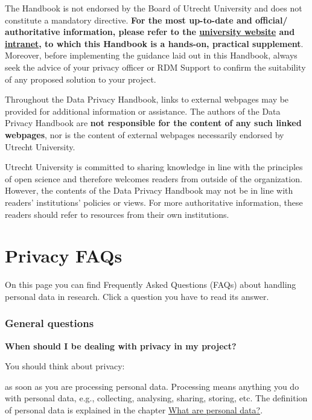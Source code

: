 \documentclass[
]{book}
\begin{document}
The Handbook is not endorsed by the Board of Utrecht University and does not
constitute a mandatory directive. \textbf{For the most up-to-date and official/
authoritative information, please refer to the
\href{https://www.uu.nl/en/research/research-data-management}{university website}
and \href{https://intranet.uu.nl/en/knowledge-base/privacy-at-uu}{intranet},
to which this Handbook is a hands-on, practical supplement}. Moreover, before
implementing the guidance laid out in this Handbook, always seek the advice of
your privacy officer or RDM Support to confirm the suitability of any proposed
solution to your project.

Throughout the Data Privacy Handbook, links to external webpages may be provided
for additional information or assistance. The authors of the Data Privacy
Handbook are \textbf{not responsible for the content of any such linked webpages}, nor
is the content of external webpages necessarily endorsed by Utrecht University.

Utrecht University is committed to sharing knowledge in line with the principles
of open science and therefore welcomes readers from outside of the organization.
However, the contents of the Data Privacy Handbook may not be in line with readers'
institutions' policies or views. For more authoritative information, these
readers should refer to resources from their own institutions.

\hypertarget{faq}{%
\chapter{Privacy FAQs}\label{faq}}

On this page you can find Frequently Asked Questions (FAQs) about handling
personal data in research. Click a question you have to read its answer.

\hypertarget{general}{%
\subsection{General questions}\label{general}}

\textbf{When should I be dealing with privacy in my project?}

You should think about privacy:

as soon as you are processing personal data. Processing means anything you do with personal data, e.g., collecting, analysing, sharing, storing, etc. The definition of personal data is explained in the chapter \protect\hyperlink{personal-data}{What are personal data?}.
\end{document}
